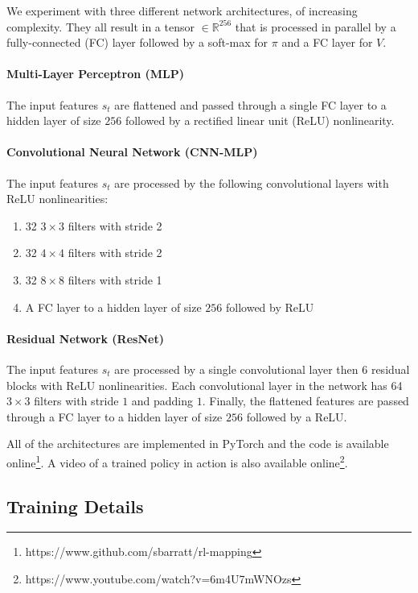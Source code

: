 \documentclass{article}
\begin{document}
We experiment with three different network architectures, of increasing complexity. They all result in a tensor $\in \mathbb{R}^{256}$ that is processed in parallel by a fully-connected (FC) layer followed by a soft-max for $\pi$ and a FC layer for $V$.

\paragraph{Multi-Layer Perceptron (MLP)} The input features $s_t$ are flattened and passed through a single FC layer to a hidden layer of size $256$ followed by a rectified linear unit (ReLU) nonlinearity.

\paragraph{Convolutional Neural Network (CNN-MLP)} The input features $s_t$ are processed by the following convolutional layers with ReLU nonlinearities:
\begin{enumerate}
\itemsep0em
\item[{(1)}] 32 $3 \times 3$ filters with stride 2
\item[{(2)}] 32 $4 \times 4$ filters with stride 2
\item[{(3)}] 32 $8 \times 8$ filters with stride 1
\item[{(4)}] A FC layer to a hidden layer of size $256$ followed by ReLU
\end{enumerate}

\paragraph{Residual Network (ResNet)} The input features $s_t$ are processed by a single convolutional layer then 6 residual blocks \cite{he2016deep} with ReLU nonlinearities. Each convolutional layer in the network has 64 $3 \times 3$ filters with stride $1$ and padding $1$. Finally, the flattened features are passed through a FC layer to a hidden layer of size $256$ followed by a ReLU.

All of the architectures are implemented in PyTorch \cite{PyTorch} and the code is available online\footnote{https://www.github.com/sbarratt/rl-mapping}. A video of a trained policy in action is also available online\footnote{https://www.youtube.com/watch?v=6m4U7mWNOzs}.

\subsection{Training Details}
\end{document}
